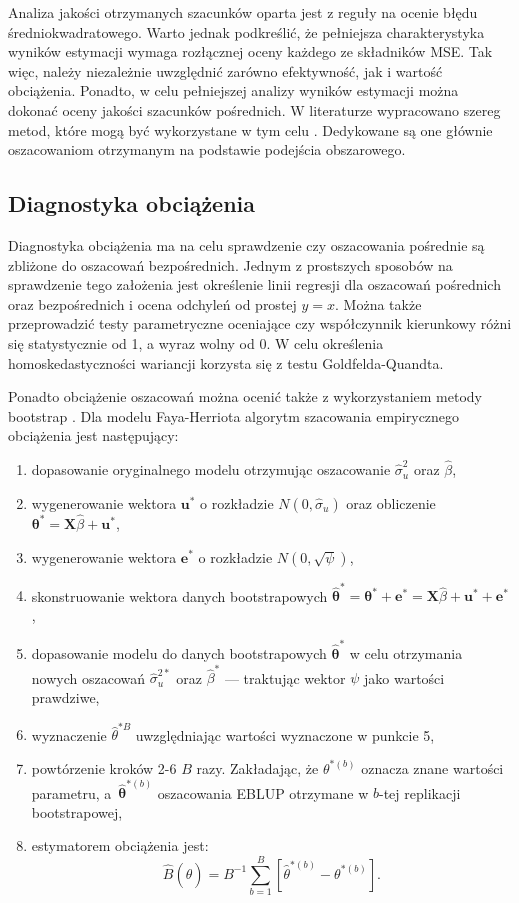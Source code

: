 Analiza jakości otrzymanych szacunków oparta jest z reguły na ocenie błędu średniokwadratowego. Warto jednak podkreślić, że pełniejsza charakterystyka wyników estymacji wymaga rozłącznej oceny każdego ze składników MSE. Tak więc, należy niezależnie uwzględnić zarówno efektywność, jak i wartość obciążenia. Ponadto, w celu pełniejszej analizy wyników estymacji można dokonać oceny jakości szacunków pośrednich. W literaturze wypracowano szereg metod, które mogą być wykorzystane w tym celu \citep{brown2001}. Dedykowane są one głównie oszacowaniom otrzymanym na podstawie podejścia obszarowego.

\subsection{Diagnostyka obciążenia}

Diagnostyka obciążenia ma na celu sprawdzenie czy oszacowania pośrednie są zbliżone do oszacowań bezpośrednich. Jednym z prostszych sposobów na sprawdzenie tego założenia jest określenie linii regresji dla oszacowań pośrednich oraz bezpośrednich i ocena odchyleń od prostej $y=x$. Można także przeprowadzić testy parametryczne oceniające czy współczynnik kierunkowy różni się statystycznie od 1, a wyraz wolny od 0. W celu określenia homoskedastyczności wariancji korzysta się z testu Goldfelda-Quandta.

Ponadto obciążenie oszacowań można ocenić także z wykorzystaniem metody bootstrap \citep{davison1997}. Dla modelu Faya-Herriota algorytm szacowania empirycznego obciążenia jest następujący:

\begin{enumerate}
\item dopasowanie oryginalnego modelu otrzymując oszacowanie $\hat{\sigma}_u^2$ oraz $\hat{\beta}$,
\item wygenerowanie wektora $\mathbf{u^*}$ o rozkładzie $N(0, \hat{\sigma}_u)$ oraz obliczenie $\mathbf{\theta^*}=\mathbf{X}\hat{\beta}+\mathbf{u^*}$,
\item wygenerowanie wektora $\mathbf{e^*}$ o rozkładzie $N(0, \sqrt{\psi})$,
\item skonstruowanie wektora danych bootstrapowych $\mathbf{\hat{\theta}^*}=\mathbf{\theta^*}+\mathbf{e^*}=\mathbf{X}\hat{\beta}+\mathbf{u^*}+\mathbf{e^*}$,
\item dopasowanie modelu do danych bootstrapowych $\mathbf{\hat{\theta}^*}$ w celu otrzymania nowych oszacowań $\hat{\sigma}_u^{2*}$ oraz $\hat{\beta}^{*}$ --- traktując wektor $\psi$ jako wartości prawdziwe,
\item wyznaczenie $\hat{\theta}^{*B}$ uwzględniając wartości wyznaczone w punkcie 5,
\item powtórzenie kroków 2-6 $B$ razy. Zakładając, że $\theta^{*(b)}$ oznacza znane wartości parametru, a~$\mathbf{\hat{\theta}}^{*(b)}$ oszacowania EBLUP otrzymane w $b$-tej replikacji bootstrapowej,
\item estymatorem obciążenia jest: 
\begin{equation}
\hat{B}(\hat{\theta})=B^{-1}\sum\limits_{b=1}^{B}{[\hat{\theta}^{*(b)}-\theta^{*(b)}]}.\end{equation}
\end{enumerate}

